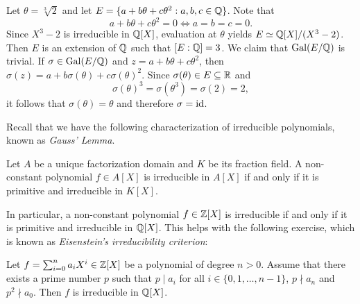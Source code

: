 \begin{example}
	Let $\theta=\sqrt[3]{2}$ and let $E=\{a+b\theta+c\theta^2:a,b,c\in\mathbb{Q}\}$. Note that 
\[
	a+b\theta+c\theta^2=0 \Longleftrightarrow a=b=c=0. 
\]
Since $X^3-2$ is irreducible in $\mathbb{Q}[X]$, evaluation
at $\theta$ yields $E\simeq\mathbb{Q}[X]/(X^3-2)$. 
Then $E$ is an extension of $\mathbb{Q}$ such that $[E:\mathbb{Q}]=3$. We claim
that $\operatorname{Gal}(E/\mathbb{Q})$ is trivial. If 
$\sigma\in\operatorname{Gal}(E/\mathbb{Q})$ and $z=a+b\theta+c\theta^2$, then
$\sigma(z)=a+b\sigma(\theta)+c\sigma(\theta)^2$. Since
$\sigma(\theta)\in E\subseteq\mathbb{R}$ and 
\[
\sigma(\theta)^3=\sigma(\theta^3)=\sigma(2)=2,
\]
it follows
that $\sigma(\theta)=\theta$ and therefore
$\sigma=\operatorname{id}$. 
\end{example}


Recall that we have the following 
characterization of irreducible polynomials, known as \emph{Gauss' Lemma}.

\begin{lemma}
\label{Gauss Lemma}
    Let $A$ be a unique factorization domain and $K$ be its fraction field.
    A non-constant polynomial $f\in A[X]$ is irreducible in $A[X]$ if and only if it is primitive and irreducible in $K[X]$.
\end{lemma}

In particular, a non-constant polynomial $f\in \mathbb{Z}[X]$ is irreducible if and only if it is primitive and irreducible in $\mathbb{Q}[X]$.
This helps with the following exercise,
which is known as 
\emph{Eisenstein's irreducibility criterion}:

\begin{exercise}
\label{xca:Eisenstein's criterion}
    Let $f=\sum_{i=0}^n a_iX^i\in \mathbb{Z}[X]$ be a polynomial of degree $n>0$. 
    Assume that there exists a prime number $p$ such that
    $p\mid a_i$ for all $i\in\{0,1,\dots,n-1\}$, $p\nmid a_n$ and
    $p^2\nmid a_0$. Then $f$ is irreducible in $\mathbb{Q}[X]$. 
\end{exercise}

